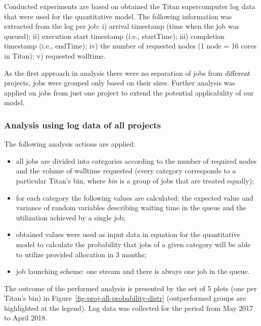 Conducted experiments are based on obtained the Titan supercomputer log data that were used for the quantitative model. The following information was extracted from the log per job: i) arrival timestamp (time when the job was queued); ii) execution start timestamp (i.e., startTime); iii) completion timestamp (i.e., endTime); iv) the number of requested nodes (1 node = 16 cores in Titan); v) requested walltime.

As the first approach in analysis there were no separation of jobs from different projects, jobs were grouped only based on their sizes. Further analysis was applied on jobs from just one project to extend the potential applicability of our model.

\subsubsection{Analysis using log data of all projects} \label{sec-experiments-3-1}

The following analysis actions are applied:
\begin{itemize}
    \item all jobs are divided into categories according to the number of required nodes and the volume of walltime requested (every category corresponds to a particular Titan's bin, where \textit{bin} is a group of jobs that are treated equally);
    \item for each category the following values are calculated: the expected value and variance of random variables describing waiting time in the queue and the utilization achieved by a single job;
    \item obtained values were used as input data in equation for the quantitative model to calculate the probability that jobs of a given category will be able to utilize provided allocation in 3 months;
    \item job launching scheme: one stream and there is always one job in the queue.
\end{itemize}

The outcome of the performed analysis is presented by the set of 5 plots (one per Titan's bin) in Figure~\ref{fig-proj-all-probability-distr} (outperformed groups are highlighted at the legend). Log data was collected for the period from May 2017 to April 2018.

